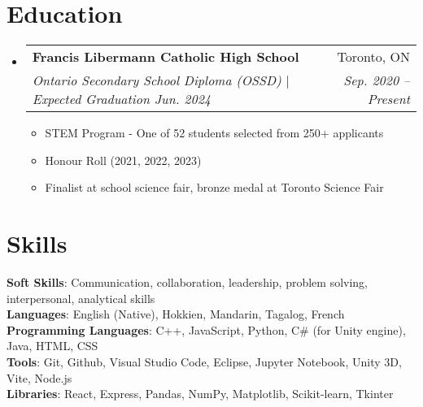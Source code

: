 \documentclass[letterpaper,11pt]{article}
\makeatletter
\newcommand{\resumeItem}[1]{
  \item\small{
    {#1 \vspace{-2pt}}
  }
}
\newcommand{\resumeSubheading}[4]{
  \vspace{-2pt}\item
    \begin{tabular*}{0.97\textwidth}[t]{l@{\extracolsep{\fill}}r}
      \textbf{#1} & #2 \\
      \textit{\small#3} & \textit{\small #4} \\
    \end{tabular*}\vspace{-7pt}
}
\newcommand{\resumeSubSubheading}[2]{
    \item
    \begin{tabular*}{0.97\textwidth}{l@{\extracolsep{\fill}}r}
      \textit{\small#1} & \textit{\small #2} \\
    \end{tabular*}\vspace{-7pt}
}
\newcommand{\resumeSubHeadingListStart}{\begin{itemize}[leftmargin=0.15in, label={}]}
\newcommand{\resumeSubHeadingListEnd}{\end{itemize}}
\newcommand{\resumeItemListStart}{\begin{itemize}}
\newcommand{\resumeItemListEnd}{\end{itemize}\vspace{-5pt}}
\makeatother
\begin{document}
\section{Education}
  \resumeSubHeadingListStart
    \resumeSubheading
      {Francis Libermann Catholic High School}{Toronto, ON}
      {Ontario Secondary School Diploma (OSSD) $|$ Expected Graduation Jun. 2024}{Sep. 2020 -- Present}
      \resumeItemListStart
        \resumeItem{STEM Program - One of 52 students selected from 250+ applicants}
        \resumeItem{Honour Roll (2021, 2022, 2023)}
        \resumeItem{Finalist at school science fair, bronze medal at Toronto Science Fair}
      \resumeItemListEnd
  \resumeSubHeadingListEnd


\section{Skills}
 \begin{itemize}[leftmargin=0.15in, label={}]
    \small{\item{
     \textbf{Soft Skills}{: Communication, collaboration, leadership, problem solving, interpersonal, analytical skills} \\
     \textbf{Languages}{: English (Native), Hokkien, Mandarin, Tagalog, French} \\
     \textbf{Programming Languages}{: C++, JavaScript, Python, C\# (for Unity engine), Java, HTML, CSS} \\
     \textbf{Tools}{: Git, Github, Visual Studio Code, Eclipse, Jupyter Notebook, Unity 3D, Vite, Node.js} \\
     \textbf{Libraries}{: React, Express, Pandas, NumPy, Matplotlib, Scikit-learn, Tkinter}
    }}
 \end{itemize}
\end{document}

